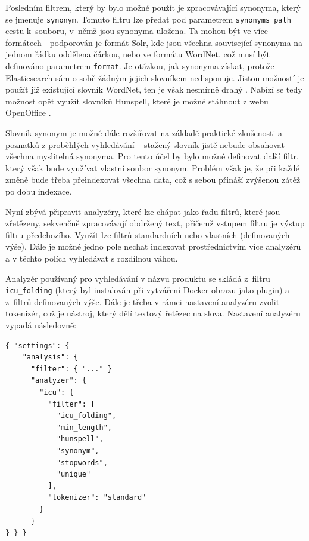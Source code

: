 \documentclass[FM,DP]{tulthesis}
\newenvironment{code}
    {\filbreak\captionsetup{type=listing}}{\filbreak}
\begin{document}
Posledním filtrem, který by bylo možné použít je zpracovávající synonyma, který se jmenuje 
\verb|synonym|. Tomuto filtru lze předat pod parametrem \verb|synonyms_path| cestu
k~souboru, v~němž jsou synonyma uložena. Ta mohou být ve více formátech - podporován
je formát Solr, kde jsou všechna související synonyma na jednom řádku oddělena čárkou,
nebo ve formátu WordNet, což musí být definováno parametrem \verb|format|.
Je otázkou, jak synonyma získat, protože Elasticsearch sám o sobě žádným jejich
slovníkem nedisponuje. Jistou možností je použít již existující slovník WordNet, 
ten je však nesmírně drahý \cite{wordnet}. Nabízí se tedy možnost opět využít slovníků
Hunspell, které je možné stáhnout z webu OpenOffice \cite{hunspell-download}.

Slovník synonym je možné dále rozšiřovat na základě praktické zkušenosti a poznatků
z proběhlých vyhledávání -- stažený slovník jistě nebude obsahovat všechna myslitelná
synonyma. Pro tento účel by bylo možné definovat další filtr, který však bude využívat
vlastní soubor synonym. Problém však je, že při každé změně bude třeba přeindexovat
všechna data, což s sebou přináší zvýšenou zátěž po dobu indexace.

Nyní zbývá připravit analyzéry, které lze chápat jako řadu filtrů, které jsou zřetězeny, 
sekvenčně zpracovávají obdržený text, přičemž vstupem filtru je výstup filtru předchozího. Využít 
lze filtrů standardních nebo vlastních (definovaných výše). Dále je možné jedno pole nechat indexovat
prostřednictvím více analyzérů a v těchto polích vyhledávat s rozdílnou váhou. 

Analyzér používaný pro vyhledávání v názvu produktu se skládá z~filtru \verb|icu_folding| 
(který byl instalován při vytváření Docker obrazu jako plugin) a z~filtrů definovaných výše.
Dále je třeba v rámci nastavení analyzéru zvolit tokenizér, což je nástroj, který dělí textový
řetězec na slova. Nastavení analyzéru vypadá následovně:

\begin{code}
\captionsetup{singlelinecheck=false,justification=raggedright}
\label{code:es-analyzers}
\begin{verbatim}
{ "settings": {
    "analysis": {
      "filter": { "..." }
      "analyzer": {
        "icu": {
          "filter": [
            "icu_folding",
            "min_length",
            "hunspell",
            "synonym",
            "stopwords",
            "unique"
          ],
          "tokenizer": "standard"
        }
      }
} } }
\end{verbatim}
\end{code}
\end{document}
